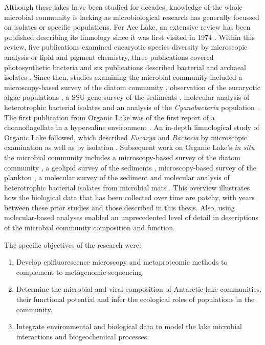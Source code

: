 Although these lakes have been studied for decades, knowledge of the whole microbial community is lacking as microbiological research has generally focussed on isolates or specific populations.
For Ace Lake, an extensive review has been published describing its limnology since it was first visited in 1974 \cite{Rankin1999}.
Within this review, five publications examined eucaryotic species diversity by microscopic analysis or lipid and pigment chemistry, three publications covered photosynthetic bacteria and six publications described bacterial and archaeal isolates \cite{Rankin1999}.
Since then, studies examining the microbial community included a microscopy-based survey of the diatom community \cite{Roberts1996}, observation of the eucaryotic algae populations \cite{Bell2003}, a \ac{SSU} gene survey of the sediments \cite{Bowman2000a}, molecular analysis of heterotrophic bacterial isolates \cite{VanTrappen2002} and an analysis of the \emph{Cyanobacteria} population \cite{Powell2005}.
The first publication from Organic Lake was of the first report of a choanoflagellate in a hypersaline environment \cite{vandenHoff1986}. 
An in-depth limnological study of Organic Lake followed, which described \emph{Eucarya} and \emph{Bacteria} by microscopic examination as well as by isolation \cite{Franzmann1987b}.
Subsequent work on Organic Lake's \emph{in situ} the microbial community includes a microscopy-based survey of the diatom community \cite{Roberts1996}, a geolipid survey of the sediments \cite{Rogerson1996}, microscopy-based survey of the plankton \cite{Perriss1997}, a molecular survey of the sediment \cite{Bowman2000b} and molecular analysis of heterotrophic bacterial isolates from microbial mats \cite{VanTrappen2002}.
This overview illustrates how the biological data that has been collected over time are patchy, with years between these prior studies and those described in this thesis.
Also, using molecular-based analyses enabled an unprecedented level of detail in descriptions of the microbial community composition and function.

The specific objectives of the research were:

\begin{enumerate}
\item 
  Develop epifluorescence microscopy and metaproteomic methods to complement to metagenomic sequencing.

\item
  Determine the microbial and viral composition of Antarctic lake communities, their functional potential and infer the ecological roles of populations in the community.

\item
  Integrate environmental and biological data to model the lake microbial interactions and biogeochemical processes.

\end{enumerate}
